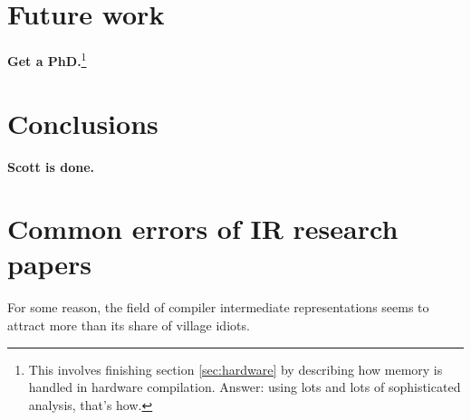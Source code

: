 \documentclass[12pt,titlepage,twoside]{article}
\let\oldsection\section
\renewcommand{\section}{\setcounter{figure}{0}\oldsection}
\begin{document}
\section{Future work}
\textbf{Get a PhD.}\footnote{This involves finishing section
\ref{sec:hardware} by describing how memory is handled in hardware
compilation.  Answer: using lots and lots of sophisticated analysis,
that's how.}

\section{Conclusions}
\textbf{Scott is done.}

\newpage

\newpage
\appendix
\section{Common errors of IR research papers}
For some reason, the field of compiler intermediate representations
seems to attract more than its share of village idiots.
\end{document}
